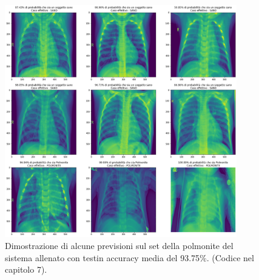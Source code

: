 \begin{figure}[H]
  \centering
  \includegraphics[width=0.9\textwidth]{Figures/pneumonia results.png}
  \caption{\small{Dimostrazione di alcune previsioni sul set della polmonite del sistema allenato con testin accuracy media del 93.75$\%$. (Codice nel capitolo 7).
  } %
  } %
  \label{fi:dcalc}
\end{figure}
 
 
 

